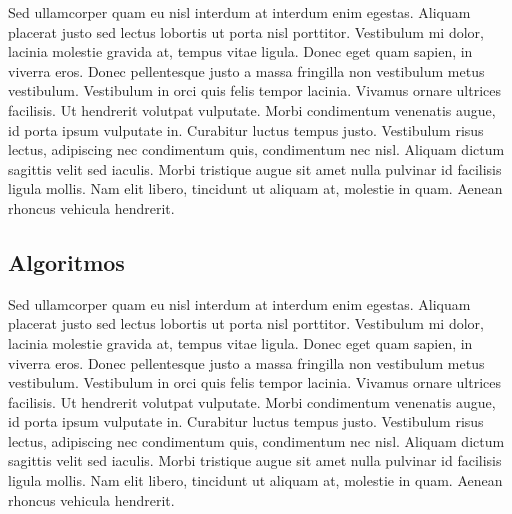 Sed ullamcorper quam eu nisl interdum at interdum enim egestas. Aliquam placerat justo sed lectus lobortis ut porta nisl porttitor. Vestibulum mi dolor, lacinia molestie gravida at, tempus vitae ligula. Donec eget quam sapien, in viverra eros. Donec pellentesque justo a massa fringilla non vestibulum metus vestibulum. Vestibulum in orci quis felis tempor lacinia. Vivamus ornare ultrices facilisis. Ut hendrerit volutpat vulputate. Morbi condimentum venenatis augue, id porta ipsum vulputate in. Curabitur luctus tempus justo. Vestibulum risus lectus, adipiscing nec condimentum quis, condimentum nec nisl. Aliquam dictum sagittis velit sed iaculis. Morbi tristique augue sit amet nulla pulvinar id facilisis ligula mollis. Nam elit libero, tincidunt ut aliquam at, molestie in quam. Aenean rhoncus vehicula hendrerit.


\subsection{Algoritmos}

Sed ullamcorper quam eu nisl interdum at interdum enim egestas. Aliquam placerat justo sed lectus lobortis ut porta nisl porttitor. Vestibulum mi dolor, lacinia molestie gravida at, tempus vitae ligula. Donec eget quam sapien, in viverra eros. Donec pellentesque justo a massa fringilla non vestibulum metus vestibulum. Vestibulum in orci quis felis tempor lacinia. Vivamus ornare ultrices facilisis. Ut hendrerit volutpat vulputate. Morbi condimentum venenatis augue, id porta ipsum vulputate in. Curabitur luctus tempus justo. Vestibulum risus lectus, adipiscing nec condimentum quis, condimentum nec nisl. Aliquam dictum sagittis velit sed iaculis. Morbi tristique augue sit amet nulla pulvinar id facilisis ligula mollis. Nam elit libero, tincidunt ut aliquam at, molestie in quam. Aenean rhoncus vehicula hendrerit.
